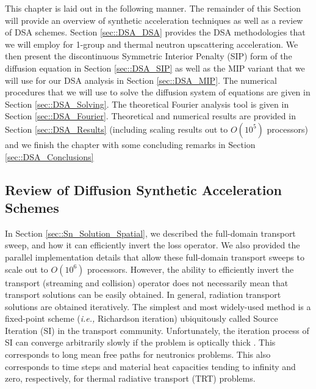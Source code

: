 This chapter is laid out in the following manner. The remainder of this Section will provide an overview of synthetic acceleration techniques as well as a review of DSA schemes. Section \ref{sec::DSA_DSA} provides the DSA methodologies that we will employ for 1-group and thermal neutron upscattering acceleration. We then present the discontinuous Symmetric Interior Penalty (SIP) form of the diffusion equation in Section \ref{sec::DSA_SIP} as well as the MIP variant that we will use for our DSA analysis in Section \ref{sec::DSA_MIP}. The numerical procedures that we will use to solve the diffusion system of equations are given in Section \ref{sec::DSA_Solving}. The theoretical Fourier analysis tool is given in Section \ref{sec::DSA_Fourier}. Theoretical and numerical results are provided in Section \ref{sec::DSA_Results} (including scaling results out to $O(10^5)$ processors) and we finish the chapter with some concluding remarks in Section \ref{sec::DSA_Conclusions}

\subsection{Review of Diffusion Synthetic Acceleration Schemes}
\label{sec::DSA_Introduction_History}

In Section \ref{sec::Sn_Solution_Spatial}, we described the full-domain transport sweep, and how it can efficiently invert the loss operator. We also provided the parallel implementation details that allow these full-domain transport sweeps to scale out to $O(10^6)$ processors. However, the ability to efficiently invert the transport (streaming and collision) operator does not necessarily mean that transport solutions can be easily obtained. In general, radiation transport solutions are obtained iteratively. The simplest and most widely-used method is a fixed-point scheme ({\em i.e.,} Richardson iteration) ubiquitously called Source Iteration (SI) in the transport community. Unfortunately, the iteration process of SI can converge arbitrarily slowly if the problem is optically thick \cite{ref::adams_larsen_iter_methods}. This corresponds to long mean free paths for neutronics problems. This also corresponds to time steps and material heat capacities tending to infinity and zero, respectively, for thermal radiative transport (TRT) problems.

